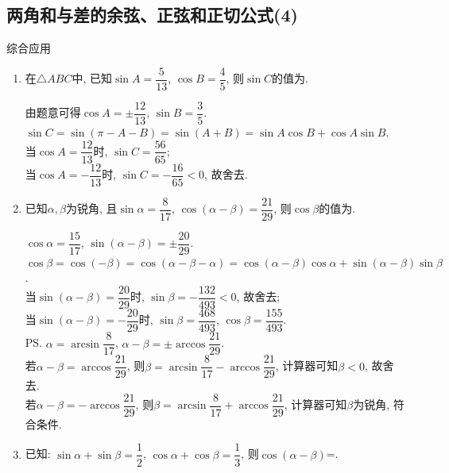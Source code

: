 \clearpage
\subsection{两角和与差的余弦、正弦和正切公式(4)}
\zsd 综合应用


\begin{enumerate}
\item 在$\triangle{ABC}$中, 已知$\sin{A}=\dfrac{5}{13}$, $\cos{B}=\dfrac{4}{5}$, 则$\sin{C}$的值为. 
\begin{jieda}
由题意可得$\cos{A}=\pm\dfrac{12}{13}$, $\sin{B}=\dfrac{3}{5}$. \\
$\sin{C}=\sin(\pi-A-B)=\sin(A+B)=\sin{A}\cos{B}+\cos{A}\sin{B}$. \\
当$\cos{A}=\dfrac{12}{13}$时, $\sin{C}=\dfrac{56}{65}$; \\
当$\cos{A}=-\dfrac{12}{13}$时, $\sin{C}=-\dfrac{16}{65}<0$, 故舍去. 
\end{jieda}


\item 已知$\alpha,\beta$为锐角, 且$\sin\alpha=\dfrac{8}{17}$, $\cos(\alpha-\beta)=\dfrac{21}{29}$, 
则$\cos\beta$的值为.  %
\begin{jieda}
$\cos\alpha=\dfrac{15}{17}$, $\sin(\alpha-\beta)=\pm\dfrac{20}{29}$. \\
$\cos\beta=\cos(-\beta)=\cos(\alpha-\beta-\alpha)=\cos(\alpha-\beta)\cos\alpha+\sin(\alpha-\beta)\sin\beta$. \\
当$\sin(\alpha-\beta)=\dfrac{20}{29}$时, $\sin\beta=-\dfrac{132}{493}<0$, 故舍去; \\ %
当$\sin(\alpha-\beta)=-\dfrac{20}{29}$时, $\sin\beta=\dfrac{468}{493}$, $\cos\beta=\dfrac{155}{493}$. \\
\ps $\alpha=\arcsin\dfrac{8}{17}$, $\alpha-\beta=\pm\arccos\dfrac{21}{29}$. \\
若$\alpha-\beta=\arccos\dfrac{21}{29}$, 则$\beta=\arcsin\dfrac{8}{17}-\arccos\dfrac{21}{29}$, 计算器可知$\beta<0$, 故舍去. \\
若$\alpha-\beta=-\arccos\dfrac{21}{29}$, 则$\beta=\arcsin\dfrac{8}{17}+\arccos\dfrac{21}{29}$, 计算器可知$\beta$为锐角, 符合条件. 
\end{jieda}

\item 已知: $\sin\alpha+\sin\beta=\dfrac{1}{2}$, $\cos\alpha+\cos\beta=\dfrac{1}{3}$, 则$\cos(\alpha-\beta)$=. 


\end{enumerate}
